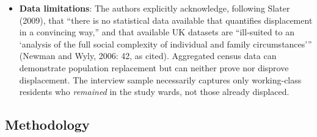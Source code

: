 \begin{itemize}
  \item \textbf{Data limitations}: The authors explicitly acknowledge, following Slater (2009), that ``there is no statistical data available that quantifies displacement in a convincing way,'' and that available UK datasets are ``ill-suited to an `analysis of the full social complexity of individual and family circumstances''' (Newman and Wyly, 2006: 42, as cited). Aggregated census data can demonstrate population replacement but can neither prove nor disprove displacement. The interview sample necessarily captures only working-class residents who \emph{remained} in the study wards, not those already displaced.
\end{itemize}

\subsection*{Methodology}


